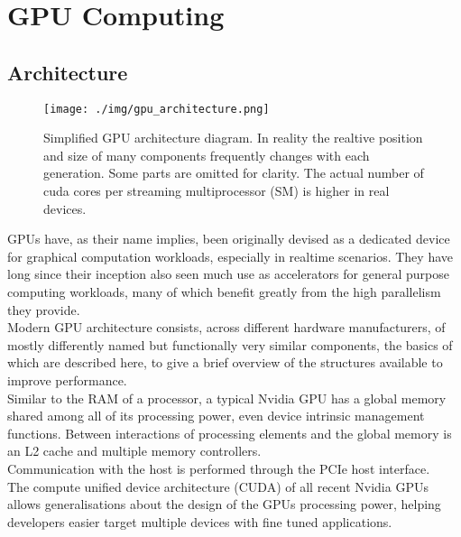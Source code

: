 \documentclass{tudscrreprt}
\begin{document}
		\section{GPU Computing}
			\subsection{Architecture}
				\begin{figure}[!ht]
					\centering
					\texttt{[image: ./img/gpu\_architecture.png]}
					\caption{\label{fig:gpu_architecture}Simplified GPU architecture diagram. In reality the realtive position and size of many components frequently changes with each generation. Some parts are omitted for clarity. The actual number of cuda cores per streaming multiprocessor (SM) is higher in real devices.}
				\end{figure}
				GPUs have, as their name implies, been originally devised as a dedicated device for graphical computation workloads, especially in realtime scenarios. They have long since their inception also seen much use as accelerators for general purpose computing workloads, many of which benefit greatly from the high parallelism they provide. \\
				Modern GPU architecture consists, across different hardware manufacturers, of mostly differently named but functionally very similar components, the basics of which are described here, to give a brief overview of the structures available to improve performance. \\
				
				Similar to the RAM of a processor, a typical Nvidia GPU has a global memory shared among all of its processing power, even device intrinsic management functions. Between interactions of processing elements and the global memory is an L2 cache and multiple memory controllers. \\
				Communication with the host is performed through the PCIe host interface. \\
				
				The compute unified device architecture (CUDA) of all recent Nvidia GPUs allows generalisations about the design of the GPUs processing power, helping developers easier target multiple devices with fine tuned applications. \\
				
\end{document}
